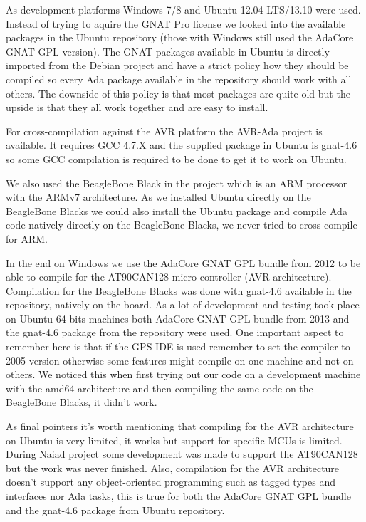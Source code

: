 As development platforms Windows 7/8 and Ubuntu 12.04 LTS/13.10 were used. Instead
of trying to aquire the GNAT Pro license we looked into the available packages
in the Ubuntu repository (those with Windows still used the AdaCore GNAT GPL version).
The GNAT packages available in Ubuntu is directly imported from the Debian
project and have a strict policy \cite{web:debian_ada_policy} how they should
be compiled so every Ada package available in the repository should work with all others.
The downside of this policy is that most packages are quite old but the upside
is that they all work together and are easy to install.

For cross-compilation against the AVR platform the AVR-Ada project \cite{web:avr-ada}
is available. It requires GCC 4.7.X and the supplied package in Ubuntu is gnat-4.6 so some
GCC compilation is required to be done to get it to work on Ubuntu.

We also used the BeagleBone Black in the project which is an ARM processor with
the ARMv7 architecture. As we installed Ubuntu directly on the BeagleBone Blacks
we could also install the Ubuntu package and compile Ada code natively directly
on the BeagleBone Blacks, we never tried to cross-compile for ARM.

In the end on Windows we use the AdaCore GNAT GPL bundle from 2012 to be able
to compile for the AT90CAN128 micro controller (AVR architecture). Compilation for
the BeagleBone Blacks was done with gnat-4.6 available in the repository, natively
on the board. As a lot of development and testing took place on Ubuntu 64-bits
machines both AdaCore GNAT GPL bundle from 2013 and the gnat-4.6 package from the
repository were used. One important aspect to remember here is that if the GPS
IDE is used remember to set the compiler to 2005 version otherwise some features
might compile on one machine and not on others. We noticed this when first trying
out our code on a development machine with the amd64 architecture and then compiling
the same code on the BeagleBone Blacks, it didn't work.

As final pointers it's worth mentioning that compiling for the AVR architecture
on Ubuntu is very limited, it works but support for specific MCUs is limited. During
Naiad project some development was made to support the AT90CAN128 but the work was
never finished. Also, compilation for the AVR architecture doesn't support any
object-oriented programming such as tagged types and interfaces nor Ada tasks, this
is true for both the AdaCore GNAT GPL bundle and the gnat-4.6 package from Ubuntu
repository.


